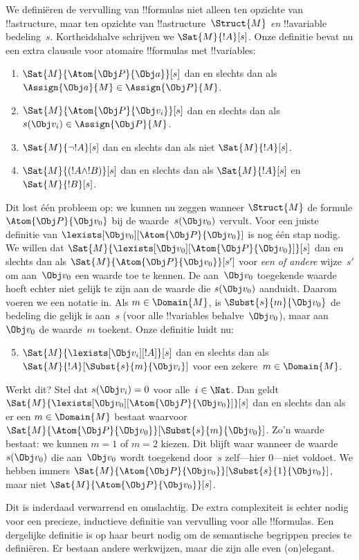 \documentclass[../../../include/open-logic-section]{subfiles}
\begin{document}
We definiëren de vervulling van !!{formula}s niet alleen ten opzichte
van !!a{structure}, maar ten opzichte van !!a{structure}~$\Struct{M}$
\emph{en} !!a{variable} bedeling~$s$. Kortheidshalve schrijven we
$\Sat{M}{!A}[s]$. Onze definitie bevat nu een extra clausule voor
atomaire !!{formula}s met !!{variable}s:
\begin{enumerate}
  \item $\Sat{M}{\Atom{\Obj P}{\Obj a}}[s]$ dan en slechts dan als
  $\Assign{\Obj a}{M} \in \Assign{\Obj P}{M}$.
  \item $\Sat{M}{\Atom{\Obj P}{\Obj v_i}}[s]$ dan en slechts dan als
  $s(\Obj v_i) \in \Assign{\Obj P}{M}$.
  \item $\Sat{M}{\lnot !A}[s]$ dan en slechts dan als niet $\Sat{M}{!A}[s]$.
  \item $\Sat{M}{(!A \land !B)}[s]$ dan en slechts dan als $\Sat{M}{!A}[s]$ en $\Sat{M}{!B}[s]$.
\end{enumerate}
Dit lost één probleem op: we kunnen nu zeggen wanneer $\Struct{M}$ de
formule $\Atom{\Obj P}{\Obj v_0}$ bij de waarde~$s(\Obj v_0)$ vervult.
Voor een juiste definitie van $\lexists[\Obj v_0][\Atom{\Obj P}{\Obj
v_0}]$ is nog één stap nodig. We willen dat
$\Sat{M}{\lexists[\Obj v_0][\Atom{\Obj P}{\Obj v_0}]}[s]$ dan en slechts
dan als $\Sat{M}{\Atom{\Obj P}{\Obj v_0}}[s']$ voor \emph{een of andere}
wijze~$s'$ om aan~$\Obj v_0$ een waarde toe te kennen. De aan~$\Obj v_0$
toegekende waarde hoeft echter niet gelijk te zijn aan de waarde die
$s(\Obj v_0)$ aanduidt.
Daarom voeren we een notatie in. Als $m \in \Domain{M}$, is
$\Subst{s}{m}{\Obj v_0}$ de bedeling die gelijk is aan~$s$ (voor alle
!!{variable}s behalve~$\Obj v_0$), maar aan $\Obj v_0$ de waarde~$m$
toekent. Onze definitie luidt nu:
\begin{enumerate}\setcounter{enumi}{4}
  \item $\Sat{M}{\lexists[\Obj v_i][!A]}[s]$ dan en slechts dan als
  $\Sat{M}{!A}[\Subst{s}{m}{\Obj v_i}]$ voor een zekere~$m \in \Domain{M}$.
\end{enumerate}
Werkt dit? Stel dat $s(\Obj v_i) = 0$ voor alle~$i \in \Nat$. Dan
geldt $\Sat{M}{\lexists[\Obj v_0][\Atom{\Obj P}{\Obj v_0}]}[s]$ dan en
slechts dan als er een $m \in \Domain{M}$ bestaat waarvoor
$\Sat{M}{\Atom{\Obj P}{\Obj v_0}}[\Subst{s}{m}{\Obj v_0}]$. Zo'n waarde
bestaat: we kunnen $m = 1$ of $m = 2$ kiezen. Dit blijft waar wanneer
de waarde~$s(\Obj v_0)$ die aan~$\Obj v_0$ wordt toegekend door~$s$
zelf---hier $0$---niet voldoet. We hebben immers
$\Sat{M}{\Atom{\Obj P}{\Obj v_0}}[\Subst{s}{1}{\Obj v_0}]$, maar niet
$\Sat{M}{\Atom{\Obj P}{\Obj v_0}}[s]$.

Dit is inderdaad verwarrend en omslachtig. De extra complexiteit is
echter nodig voor een precieze, inductieve definitie van vervulling
voor alle !!{formula}s. Een dergelijke definitie is op haar beurt
nodig om de semantische begrippen precies te definiëren. Er bestaan
andere werkwijzen, maar die zijn alle even (on)elegant.
\end{document}
